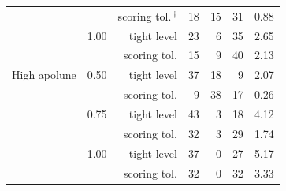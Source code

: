 \begin{tabular}{@{}l c r r r r r@{}}
 &  & scoring tol.\,$^{\dagger}$ & 18 & 15 & 31 & 0.88 \\
 & 1.00 & tight level & 23 & 6 & 35 & 2.65 \\
 &  & scoring tol. & 15 & 9 & 40 & 2.13 \\
\midrule
High apolune & 0.50 & tight level & 37 & 18 & 9 & 2.07 \\
 &  & scoring tol. & 9 & 38 & 17 & 0.26 \\
 & 0.75 & tight level & 43 & 3 & 18 & 4.12 \\
 &  & scoring tol. & 32 & 3 & 29 & 1.74 \\
 & 1.00 & tight level & 37 & 0 & 27 & 5.17 \\
 &  & scoring tol. & 32 & 0 & 32 & 3.33 \\
\bottomrule
\end{tabular}
